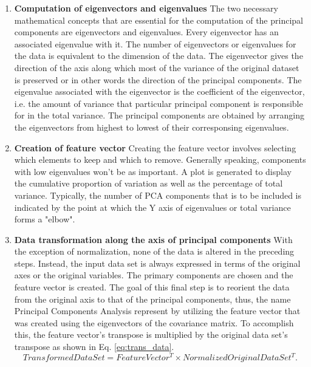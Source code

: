 \begin{enumerate}
  \item \textbf{Computation of eigenvectors and eigenvalues} The two necessary mathematical concepts that are essential for the computation of the principal components are eigenvectors and eigenvalues. Every eigenvector has an associated eigenvalue with it. The number of eigenvectors or eigenvalues for the data is equivalent to the dimension of the data. The eigenvector gives the direction of the axis along which most of the variance of the original dataset is preserved or in other words the direction of the principal components. The eigenvalue associated with the eigenvector is the coefficient of the eigenvector, i.e. the amount of variance that particular principal component is responsible for in the total variance. The principal components are obtained by arranging the eigenvectors from highest to lowest of their corresponsing eigenvalues.\cite{abdi2010principal} 
  \item \textbf{Creation of feature vector} Creating the feature vector involves selecting which elements to keep and which to remove. Generally speaking, components with low eigenvalues won't be as important. A plot is generated to display the cumulative proportion of variation as well as the percentage of total variance. Typically, the number of PCA components that is to be included is indicated by the point at which the Y axis of eigenvalues or total variance forms a "elbow".\cite{abdi2010principal}
  \item \textbf{Data transformation along the axis of principal components} With the exception of normalization, none of the data is altered in the preceding steps. Instead, the input data set is always expressed in terms of the original axes or the original variables. The primary components are chosen and the feature vector is created. The goal of this final step is to reorient the data from the original axis to that of the principal components, thus, the name Principal Components Analysis represent by utilizing the feature vector that was created using the eigenvectors of the covariance matrix. To accomplish this, the feature vector's transpose is multiplied by the original data set's transpose as shown in Eq. \ref{eq:trans_data}.\cite{abdi2010principal}
  \begin{equation}
    \label{eq:trans_data}
    \mathit{TransformedDataSet} = \mathit{FeatureVector^T \times NormalizedOriginalDataSet^T}.
  \end{equation}
\end{enumerate}
\cleardoublepage
